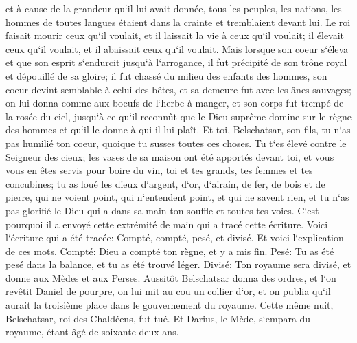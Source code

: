 \verse et à cause de la grandeur qu`il lui avait donnée, tous les peuples, les nations, les hommes de toutes langues étaient dans la crainte et tremblaient devant lui. Le roi faisait mourir ceux qu`il voulait, et il laissait la vie à ceux qu`il voulait; il élevait ceux qu`il voulait, et il abaissait ceux qu`il voulait. 
\verse Mais lorsque son coeur s`éleva et que son esprit s`endurcit jusqu`à l`arrogance, il fut précipité de son trône royal et dépouillé de sa gloire; 
\verse il fut chassé du milieu des enfants des hommes, son coeur devint semblable à celui des bêtes, et sa demeure fut avec les ânes sauvages; on lui donna comme aux boeufs de l`herbe à manger, et son corps fut trempé de la rosée du ciel, jusqu`à ce qu`il reconnût que le Dieu suprême domine sur le règne des hommes et qu`il le donne à qui il lui plaît. 
\verse Et toi, Belschatsar, son fils, tu n`as pas humilié ton coeur, quoique tu susses toutes ces choses. 
\verse Tu t`es élevé contre le Seigneur des cieux; les vases de sa maison ont été apportés devant toi, et vous vous en êtes servis pour boire du vin, toi et tes grands, tes femmes et tes concubines; tu as loué les dieux d`argent, d`or, d`airain, de fer, de bois et de pierre, qui ne voient point, qui n`entendent point, et qui ne savent rien, et tu n`as pas glorifié le Dieu qui a dans sa main ton souffle et toutes tes voies. 
\verse C`est pourquoi il a envoyé cette extrémité de main qui a tracé cette écriture. 
\verse Voici l`écriture qui a été tracée: Compté, compté, pesé, et divisé. 
\verse Et voici l`explication de ces mots. Compté: Dieu a compté ton règne, et y a mis fin. 
\verse Pesé: Tu as été pesé dans la balance, et tu as été trouvé léger. 
\verse Divisé: Ton royaume sera divisé, et donne aux Mèdes et aux Perses. 
\verse Aussitôt Belschatsar donna des ordres, et l`on revêtit Daniel de pourpre, on lui mit au cou un collier d`or, et on publia qu`il aurait la troisième place dans le gouvernement du royaume. 
\verse Cette même nuit, Belschatsar, roi des Chaldéens, fut tué. 
\verse Et Darius, le Mède, s`empara du royaume, étant âgé de soixante-deux ans. 

